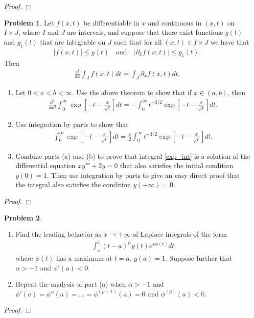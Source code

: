 \documentclass[12pt]{article}
\theoremstyle{definition}
\newtheorem{problem}{Problem}
\begin{document}
\begin{proof}
\end{proof}
\newpage


\begin{problem}
  Let $f(x, t)$ be differentiable in $x$ and continuous in $(x, t)$ on $I \times J$,
  where $I$ and $J$ are intervals, and suppose that there exist functions $g(t)$ and $g_1(t)$
  that are integrable on $J$ such that for all $(x,t) \in I \times J$ we have that
  \begin{align*}
    |f(x,t)|\leq g(t) \quad \text{and} \quad |\partial_x f(x,t)| \leq g_1(t).
  \end{align*}
  Then
  \begin{align*}
    \frac{d}{dx} \int_J f(x,t) dt = \int_J \partial_x f(x,t) dt.
  \end{align*}
  \begin{enumerate}
    \item Let $0 < a < b < \infty$. Use the above theorem to show that if $x \in (a,b)$, then
      \begin{align*}
        \frac{d^3}{dx^3} \int_0^\infty \exp\left[-t - \frac{x}{\sqrt{t}}\right] dt = -\int_0^\infty t^{-3/2}\exp\left[-t - \frac{x}{\sqrt{t}}\right] dt.
      \end{align*}
    \item Use integration by parts to show that
      \begin{align*}
        \int_0^\infty \exp\left[-t - \frac{x}{\sqrt{t}}\right] dt = \frac{x}{2}\int_0^\infty t^{-3/2}\exp\left[-t - \frac{x}{\sqrt{t}}\right] dt.
      \end{align*}
    \item Combine parts (a) and (b) to prove that integral \eqref{exp_int} is a solution of the
      differential equation $xy''' + 2y = 0$ that also satisfies the initial condition $y(0) = 1$.
      Then use integration by parts to give an easy direct proof that the integral also satisfies
      the condition $y(+\infty) = 0$.
  \end{enumerate}
\end{problem}

\begin{proof}
\end{proof}
\newpage


\begin{problem}
  \begin{enumerate}
    \item Find the leading behavior as $x\to + \infty$ of Laplace integrals of the form
      \begin{align*}
        \int_a^b (t-a) ^\alpha g(t) e^{x\phi(t)} dt
      \end{align*}
      where $\phi(t)$ has a maximum at $t = a$, $g(a) = 1$. Suppose further that $\alpha > -1$ and $\phi'(a) < 0$.
    \item Repeat the analysis of part (a) when $\alpha > -1$
      and $\phi'(a) = \phi''(a) = \dots = \phi^{(p-1)}(a) = 0$ and $\phi^{(p)}(a) < 0$.
  \end{enumerate}
\end{problem}

\begin{proof}
\end{proof}
\newpage
\end{document}

